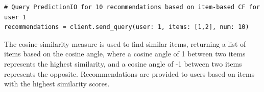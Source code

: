 \begin{lstlisting}[caption={Query for recommendations based on Item-based CF}, label={code:query_items}]
# Query PredictionIO for 10 recommendations based on item-based CF for user 1
recommendations = client.send_query(user: 1, items: [1,2], num: 10)
\end{lstlisting}

The cosine-similarity measure is used to find similar items, returning a list of items based on the cosine angle, where a cosine angle of 1 between two items represents the highest similarity, and a cosine angle of -1 between two items represents the opposite. Recommendations are provided to users based on items with the highest similarity scores. 